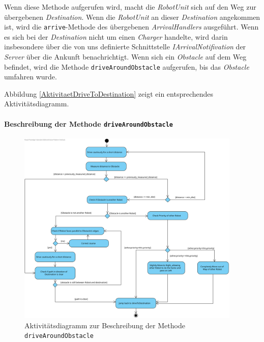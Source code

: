 			Wenn diese Methode aufgerufen wird, macht die \textit{RobotUnit} sich auf den Weg zur 
			übergebenen \textit{Destination}. Wenn die \textit{RobotUnit} an dieser \textit{Destination} 
			angekommen ist, wird die \texttt{arrive}-Methode des übergebenen \textit{ArrivalHandlers} ausgeführt. Wenn es sich bei der \textit{Destination} nicht um einen \textit{Charger} handelte, wird darin insbesondere über die von uns definierte Schnittstelle \textit{IArrivalNotifivation} der \textit{Server} über die Ankunft benachrichtigt. 
			Wenn sich ein \textit{Obstacle} auf dem Weg befindet, wird die Methode \texttt{driveAroundObstacle} 
			aufgerufen, bis das \textit{Obstacle} umfahren wurde.
			
			Abbildung \ref{AktivitaetDriveToDestination} zeigt ein entsprechendes Aktivitätsdiagramm.

			\paragraph{Beschreibung der Methode \texttt{driveAroundObstacle}}
			\begin{figure}[H]
			\centering
			\includegraphics[width=0.95\textwidth]{img/1-Entwurf-7-driveAroundObstacle}
			\caption{Aktivitätsdiagramm zur Beschreibung der Methode \texttt{driveAroundObstacle}}
			\label{AktivitätDriveAroundObstacle}
			\end{figure}


